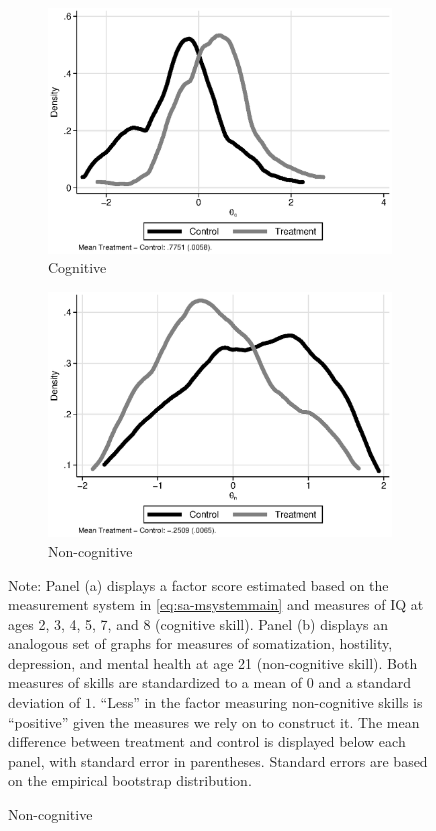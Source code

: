 \begin{figure}[!htbp]
\centering
\caption{Estimates of Cognitive ($\theta_{c}^d$) and Non-cognitive Skills ($\theta_{n}^d$)}\label{figure:factorsm}
\begin{subfigure}[h]{0.5\textwidth}
		\centering
		\caption{Cognitive} \label{fig:c}
		\includegraphics[width=\textwidth]{output/abccare_cfactor.eps}
\end{subfigure}%
\begin{subfigure}[h]{0.5\textwidth}
	\centering
	\caption{Non-cognitive} \label{fig:n}
		\includegraphics[width=\textwidth]{output/abccare_nfactor.eps}
\end{subfigure}
\footnotesize \justify
Note: Panel (a) displays a factor score estimated based on the measurement system in \eqref{eq:sa-msystemmain} and measures of IQ at ages 2, 3, 4, 5, 7, and 8 (cognitive skill). Panel (b) displays an analogous set of graphs for measures of somatization, hostility, depression, and mental health at age 21 (non-cognitive skill). Both measures of skills are standardized to a mean of $0$ and a standard deviation of $1$. ``Less'' in the factor measuring non-cognitive skills is ``positive'' given the measures we rely on to construct it. The mean difference between treatment and control is displayed below each panel, with standard error in parentheses. Standard errors are based on the empirical bootstrap distribution.
\end{figure}

